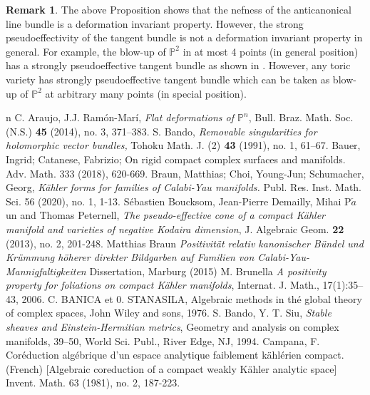 \documentclass[a4, 12pt]{amsart}
\numberwithin{equation}{section}
\theoremstyle{definition}
\newtheorem{rem}[thm]{Remark}
\def\P{\mathbb{P}}
\def\P{\mathbb{P}}
\begin{document}
\begin{rem}
The above Proposition shows that the nefness of the anticanonical line bundle is a deformation invariant property.
However, the strong pseudoeffectivity of the tangent bundle is not a deformation invariant property in general.
For example, the blow-up of $\P^2$ in at most 4 points (in general position) has a strongly pseudoeffective tangent bundle as shown in \cite{HIM}.
However, any toric variety has strongly pseudoeffective tangent bundle which can be taken as blow-up of $\P^2$ at arbitrary many points (in special position).
\end{rem}


\begin{thebibliography}{n}
C. Araujo, J.J. Ram\'on-Mar\'i,
\textit{Flat deformations of $\P^n$},    
Bull. Braz. Math. Soc. (N.S.) {\bf{45}} (2014), no. 3, 371--383.
S. Bando,
\textit{Removable singularities for holomorphic vector bundles,}
Tohoku Math. J. (2){\bf{ 43}} (1991), no. 1, 61--67. 
Bauer, Ingrid; Catanese, Fabrizio;
On rigid compact complex surfaces and manifolds. 
Adv. Math. 333 (2018), 620-669. 
Braun, Matthias; Choi, Young-Jun; Schumacher, Georg,
{\em
K\"ahler forms for families of Calabi-Yau manifolds. }
Publ. Res. Inst. Math. Sci. 56 (2020), no. 1, 1-13.
S\'ebastien Boucksom, Jean-Pierre Demailly, Mihai P$\check{a}$un and Thomas Peternell, 
\textit{The pseudo-effective cone of a compact K\"ahler manifold and varieties of negative Kodaira dimension}, 
J. Algebraic Geom. {\bf{22}} (2013), no. 2, 201-248. 
Matthias Braun
\textit{Positivit\"at relativ kanonischer B\"undel und Kr\"ummung h\"oherer direkter Bildgarben auf Familien von Calabi-Yau-Mannigfaltigkeiten}
Dissertation, Marburg (2015)
M. Brunella
\textit{A positivity property for foliations on compact K\"ahler manifolds}, 
Internat. J. Math., 17(1):35--43, 2006.
C. BANICA et 0. STANASILA, Algebraic methods in thé global theory of complex spaces, John Wiley
and sons, 1976.
S. Bando, Y. T. Siu, 
\textit{Stable sheaves and Einstein-Hermitian metrics}, 
Geometry and analysis on complex manifolds, 39--50, World Sci. Publ., River Edge, NJ, 1994.
Campana, F.
Cor\'eduction alg\'ebrique d'un espace analytique faiblement k\"ahl\'erien compact. (French) [Algebraic coreduction of a compact weakly K\"ahler analytic space]
Invent. Math. 63 (1981), no. 2, 187-223. 

\end{thebibliography}
\end{document}
